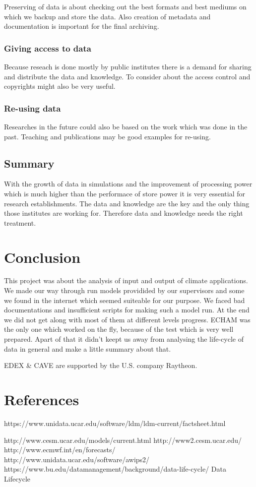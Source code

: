 \documentclass[]{article}
\begin{document}
Preserving of data is about checking out the best formats and best
mediums on which we backup and store the data. Also creation of metadata
and documentation is important for the final archiving.

\subsubsection{Giving access to data}\label{giving-access-to-data}

Because reseach is done mostly by public institutes there is a demand
for sharing and distribute the data and knowledge. To consider about the
access control and copyrights might also be very useful.

\subsubsection{Re-using data}\label{re-using-data}

Researches in the future could also be based on the work which was done
in the past. Teaching and publications may be good examples for
re-using.

\subsection{Summary}\label{summary}

With the growth of data in simulations and the improvement of processing
power which is much higher than the performace of store power it is very
essential for research establishments. The data and knowledge are the
key and the only thing those institutes are working for. Therefore data
and knowledge needs the right treatment.

\section{Conclusion}\label{conclusion-1}

This project was about the analysis of input and output of climate
applications. We made our way through run models providided by our
supervisors and some we found in the internet which seemed suiteable for
our purpose. We faced bad documentations and insufficient scripts for
making such a model run. At the end we did not get along with most of
them at different levels progress. ECHAM was the only one which worked
on the fly, because of the test which is very well prepared. Apart of
that it didn't keept us away from analysing the life-cycle of data in
general and make a little summary about that.

EDEX \& CAVE are supported by the U.S. company Raytheon.

\section{References}\label{references}

https://www.unidata.ucar.edu/software/ldm/ldm-current/factsheet.html

http://www.cesm.ucar.edu/models/current.html http://www2.cesm.ucar.edu/
http://www.ecmwf.int/en/forecasts/
http://www.unidata.ucar.edu/software/awips2/
https://www.bu.edu/datamanagement/background/data-life-cycle/ Data
Lifecycle
\end{document}
